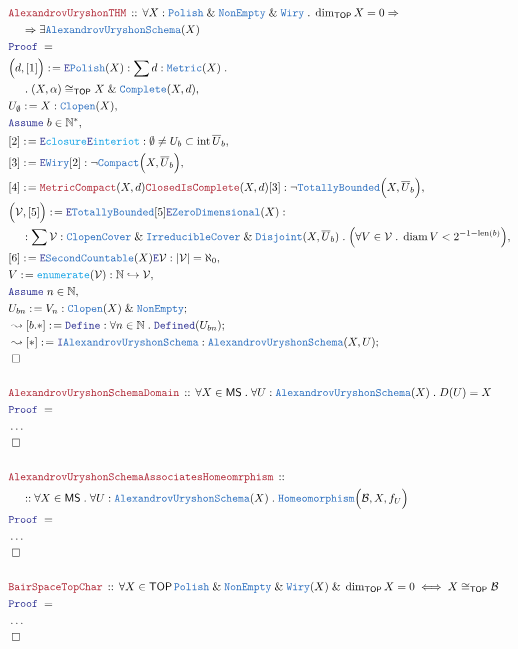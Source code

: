 \documentclass[12pt]{scrartcl}
\newcommand{\TYPE}[1]{\textcolor{NavyBlue}{\mathtt{#1}}}
\newcommand{\FUNC}[1]{\textcolor{Cerulean}{\mathtt{#1}}}
\newcommand{\LOGIC}[1]{\textcolor{Blue}{\mathtt{#1}}}
\newcommand{\THM}[1]{\textcolor{Maroon}{\mathtt{#1}}}
\renewcommand{\.}{\; . \;}
\newcommand{\de}{: \kern 0.1pc =}
\newcommand{\Theorem}[2]{& \THM{#1} \, :: \, #2 \\ & \Proof = \\ }
\newcommand{\NewLine}{\\ & \kern 1pc}
\newcommand{\Page}[1]{ \begin{align*} #1 \end{align*}   }
\newcommand{\NoProof}{ & \ldots \\ \EndProof}
\renewcommand{\And}{\; \& \;}
\newcommand{\Imply}{\Rightarrow}
\newcommand{\Intro}{\LOGIC{I}}
\newcommand{\Elim}{\LOGIC{E}}
\newcommand{\Nat}{\mathbb{N} }
\newcommand{\ToInj}{\hookrightarrow}
\newcommand{\Say}[3]{& #1 \de #2 : #3, \\}
\newcommand{\Conclude}[3]{& #1 \de #2 : #3; \\}
\newcommand{\DeriveConclude}[3]{& \leadsto #1 \de #2 : #3 ; \\}
\newcommand{\AssumeIn}[2]{& \LOGIC{Assume} \; #1 \in #2, \\}
\newcommand{\QED}{\; \square}
\newcommand{\EndProof}{& \QED \\}
\newcommand{\Proof}{\LOGIC{Proof} \; }
\newcommand{\NonEmpty}{\TYPE{NonEmpty}}
\newcommand{\B}{\mathcal{B}}
\newcommand{\Compact}{\TYPE{Compact}}
\newcommand{\Clopen}{\TYPE{Clopen}}
\DeclareMathOperator*{\intx}{int}
\newcommand{\TOP}{\mathsf{TOP}}
\newcommand{\V}{\mathcal{V}}
\DeclareMathOperator{\diam}{diam}
\newcommand{\MS}{\mathsf{MS}}
\newcommand{\FS}[1]{{#1}{}^*}
\newcommand{\Polish}{\TYPE{Polish}}
\DeclareMathOperator{\len}{len}
\begin{document}
\Page{
	\Theorem{AlexandrovUryshonTHM}
	{
		\forall X : \Polish \And \NonEmpty \And \TYPE{Wiry} \. 
		\dim_\TOP X = 0
		\Imply
		\NewLine
		\Imply
		\exists \TYPE{AlexandrovUryshonSchema}(X)
	}
	\Say{\Big(d,[1]\Big)}
	{
		\Elim \Polish(X) 
	}
	{
		\sum d : \TYPE{Metric}(X) \. 
		\NewLine \.
		(X,\alpha) \cong_\TOP X \And \TYPE{Complete}(X,d) 
	}
	\Say{U_\emptyset}{X}{\Clopen(X)}
	\AssumeIn{b}{\FS{\Nat}}
	\Say{[2]}{\Elim \FUNC{closure}\Elim \FUNC{interiot}}
	{
			\emptyset \neq U_b \subset \intx\overline{U}_b
	}
	\Say{[3]}{\Elim \TYPE{Wiry}[2]}
	{
		\neg \Compact\Big( X,\overline{U}_b \Big)
	}
	\Say{[4]}{\THM{MetricCompact}(X,d)\THM{ClosedIsComplete}(X,d)[3]}
	{
		\neg \TYPE{TotallyBounded}\Big( X, \overline{U}_b \Big)
	}
	\Say{\Big( \V,[5] \Big)}{\Elim \TYPE{TotallyBounded}[5]\Elim \TYPE{ZeroDimensional}(X)}
	{
		\NewLine : 
		\sum \V : \TYPE{ClopenCover} \And \TYPE{IrreducibleCover} \And \TYPE{Disjoint}(X,\overline{U}_b) \. 
		\Big(\forall V \in \V \. \diam V < 2^{-1-\len(b)}\Big)	
	}
	\Say{[6]}{\Elim \TYPE{SecondCountable}(X)\Elim \V}{|\V| = \aleph_0}
	\Say{V}{\FUNC{enumerate}(\V)}{\Nat \ToInj \V}
	\AssumeIn{n}{\Nat}
	\Conclude{U_{bn}}{V_n}{\Clopen(X) \And \NonEmpty}
	\DeriveConclude{[b.*]}{\LOGIC{Define}}{\forall n \in \Nat \. \LOGIC{Defined}(U_{bn})}
	\DeriveConclude{[*]}{\Intro \TYPE{AlexandrovUryshonSchema}}
	{
		\TYPE{AlexandrovUryshonSchema}(X,U)
	}
	\EndProof
	\\
	\Theorem{AlexandrovUryshonSchemaDomain}
	{
		\forall X \in \MS \. 
		\forall U : \TYPE{AlexandrovUryshonSchema}(X) \.
		D(U) = X
	}
	\NoProof
	\\
	\Theorem{AlexandrovUryshonSchemaAssociatesHomeomrphism}
	{
		\NewLine ::
		\forall X \in \MS \. 
		\forall U : \TYPE{AlexandrovUryshonSchema}(X) \.
		\TYPE{Homeomorphism}\Big(\B,X, f_U\Big)
	}
	\NoProof
	\\
	\Theorem{BairSpaceTopChar}
	{
		\forall X \in \TOP \,
		\Polish \And \NonEmpty \And \TYPE{Wiry}(X) \And \dim_\TOP X = 0
		\iff
		X \cong_\TOP \B
	}
	\NoProof
}
\newpage
\end{document}
